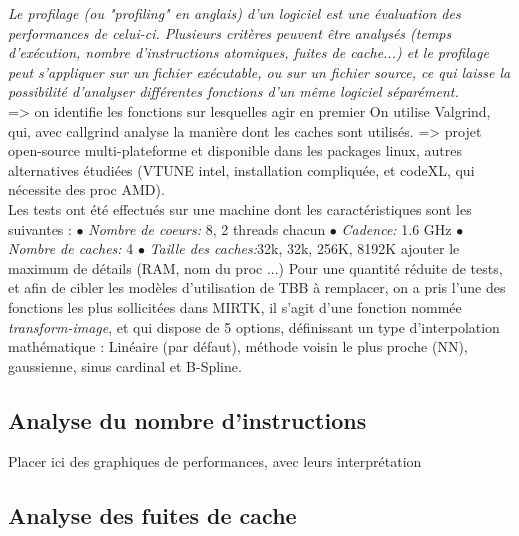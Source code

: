 \documentclass[10pt]{report}
\begin{document}
	\textit{Le profilage (ou "profiling" en anglais) d'un logiciel est une évaluation des performances de celui-ci. Plusieurs critères peuvent être analysés (temps d'exécution, nombre d'instructions atomiques, fuites de cache...) et le profilage peut s'appliquer sur un fichier exécutable, ou sur un fichier source, ce qui laisse la possibilité d'analyser différentes fonctions d'un même logiciel séparément.}\\
	
	=> on identifie les fonctions sur lesquelles agir en premier
	On utilise Valgrind, qui, avec callgrind analyse la manière dont les caches sont utilisés.
 => projet open-source multi-plateforme et disponible dans les packages linux, autres alternatives étudiées (VTUNE intel, installation compliquée, et codeXL, qui nécessite des proc AMD).\\
	
	
	Les tests ont été effectués sur une machine dont les caractéristiques sont les suivantes : \newline
	{$\bullet$} \textit{Nombre de coeurs:} 8, 2 threads chacun\newline
	{$\bullet$} \textit{Cadence:} 1.6 GHz \newline
	{$\bullet$} \textit{Nombre de caches:} 4 \newline
	{$\bullet$} \textit{Taille des caches:}32k, 32k, 256K, 8192K \newline
	ajouter le maximum de détails (RAM, nom du proc ...)\newline
	Pour une quantité réduite de tests, et afin de cibler les modèles d'utilisation de TBB à remplacer, on a pris l'une des fonctions les plus sollicitées dans MIRTK, il s'agit d'une fonction nommée \textit{transform-image}, et qui dispose de 5 options, définissant un type d'interpolation mathématique : Linéaire (par défaut), méthode voisin le plus proche (NN), gaussienne, sinus cardinal et B-Spline. 
	
	\subsection{Analyse du nombre d'instructions}
	
	Placer ici des graphiques de performances, avec leurs interprétation
	\subsection{Analyse des fuites de cache}
	
\end{document}
